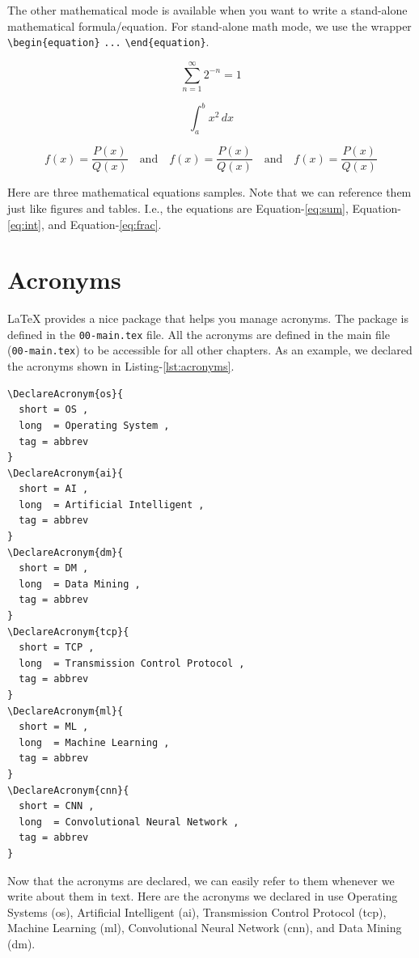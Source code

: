 The other mathematical mode is available when you want to write a stand-alone mathematical formula/equation. For stand-alone math mode, we use the wrapper \verb|\begin{equation}| \verb|...| \verb|\end{equation}|.

\begin{equation}
    \sum_{n=1}^{\infty} 2^{-n} = 1
    \label{eq:sum}
\end{equation}

\begin{equation}
    \int_{a}^{b} x^2 \,dx
    \label{eq:int}
\end{equation}

\begin{equation}
    f(x)=\frac{P(x)}{Q(x)}\quad \textrm{and}\quad \textstyle f(x)=\frac{P(x)}{Q(x)}\quad \textrm{and}\quad \scriptstyle f(x)=\frac{P(x)}{Q(x)}
    \label{eq:frac}
\end{equation}

Here are three mathematical equations samples. Note that we can reference them just like figures and tables. I.e., the equations are Equation-\ref{eq:sum}, Equation-\ref{eq:int}, and Equation-\ref{eq:frac}. 

\section{Acronyms}
\label{sec:acronyms}

{\LaTeX} provides a nice package that helps you manage acronyms. The package is defined in the \texttt{00-main.tex} file. All the acronyms are defined in the main file (\texttt{00-main.tex}) to be accessible for all other chapters. As an example, we declared the acronyms shown in Listing-\ref{lst:acronyms}.

\begin{lstlisting}[language=Tex,style=mystyle,caption={Sample Acronyms Declarations},label={lst:acronyms}]
\DeclareAcronym{os}{
  short = OS ,
  long  = Operating System ,
  tag = abbrev
}
\DeclareAcronym{ai}{
  short = AI ,
  long  = Artificial Intelligent ,
  tag = abbrev
}
\DeclareAcronym{dm}{
  short = DM ,
  long  = Data Mining ,
  tag = abbrev
}
\DeclareAcronym{tcp}{
  short = TCP ,
  long  = Transmission Control Protocol ,
  tag = abbrev
}
\DeclareAcronym{ml}{
  short = ML ,
  long  = Machine Learning ,
  tag = abbrev
}
\DeclareAcronym{cnn}{
  short = CNN ,
  long  = Convolutional Neural Network ,
  tag = abbrev
}
\end{lstlisting}

Now that the acronyms are declared, we can easily refer to them whenever we write about them in text. Here are the acronyms we declared in use Operating Systems (\ac{os}), Artificial Intelligent (\ac{ai}), Transmission Control Protocol (\ac{tcp}), Machine Learning (\ac{ml}), Convolutional Neural Network (\ac{cnn}), and Data Mining (\ac{dm}).
